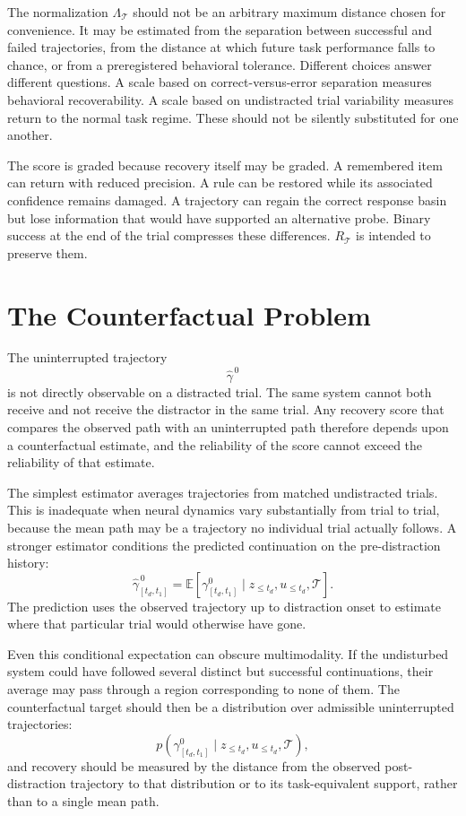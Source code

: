 \documentclass[11pt]{book}
\begin{document}
The normalization $\Lambda_{\mathcal T}$ should not be an arbitrary maximum distance chosen for convenience. It may be estimated from the separation between successful and failed trajectories, from the distance at which future task performance falls to chance, or from a preregistered behavioral tolerance. Different choices answer different questions. A scale based on correct-versus-error separation measures behavioral recoverability. A scale based on undistracted trial variability measures return to the normal task regime. These should not be silently substituted for one another.

The score is graded because recovery itself may be graded. A remembered item can return with reduced precision. A rule can be restored while its associated confidence remains damaged. A trajectory can regain the correct response basin but lose information that would have supported an alternative probe. Binary success at the end of the trial compresses these differences. $R_{\mathcal T}$ is intended to preserve them.

\section*{The Counterfactual Problem}

The uninterrupted trajectory
\[
\widehat{\gamma}^{\,0}
\]
is not directly observable on a distracted trial. The same system cannot both receive and not receive the distractor in the same trial. Any recovery score that compares the observed path with an uninterrupted path therefore depends upon a counterfactual estimate, and the reliability of the score cannot exceed the reliability of that estimate.

The simplest estimator averages trajectories from matched undistracted trials. This is inadequate when neural dynamics vary substantially from trial to trial, because the mean path may be a trajectory no individual trial actually follows. A stronger estimator conditions the predicted continuation on the pre-distraction history:
\[
\widehat{\gamma}^{\,0}_{[t_d,t_1]}
=
\mathbb E\!\left[
\gamma^{0}_{[t_d,t_1]}
\mid
z_{\leq t_d},
u_{\leq t_d},
\mathcal T
\right].
\]
The prediction uses the observed trajectory up to distraction onset to estimate where that particular trial would otherwise have gone.

Even this conditional expectation can obscure multimodality. If the undisturbed system could have followed several distinct but successful continuations, their average may pass through a region corresponding to none of them. The counterfactual target should then be a distribution over admissible uninterrupted trajectories:
\[
p\!\left(
\gamma^{0}_{[t_d,t_1]}
\mid
z_{\leq t_d},
u_{\leq t_d},
\mathcal T
\right),
\]
and recovery should be measured by the distance from the observed post-distraction trajectory to that distribution or to its task-equivalent support, rather than to a single mean path.
\end{document}
